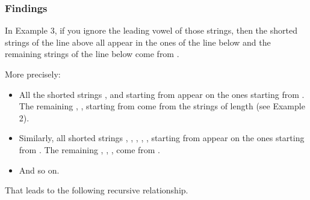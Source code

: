 \documentclass[letterpaper,12pt,english]{book}
\begin{document}
\subsubsection{Findings}
\label{\detokenize{Mathematics/09_MTH_1641_Count_Sorted_Vowel_Strings:findings}}
\sphinxAtStartPar
In Example 3, if you ignore the leading vowel of those strings, then the shorted strings of the line above all appear in the ones of the line below and the remaining strings of the line below come from .

\sphinxAtStartPar
More precisely:
\begin{itemize}
\item {} 
\sphinxAtStartPar
All the shorted strings ,  and  starting from  appear on the ones starting from . The remaining , ,  starting from  come from the strings of length  (see Example 2).

\item {} 
\sphinxAtStartPar
Similarly, all shorted strings , , , , ,  starting from  appear on the ones starting from . The remaining , , ,  come from .

\item {} 
\sphinxAtStartPar
And so on.

\end{itemize}

\sphinxAtStartPar
That leads to the following recursive relationship.
\end{document}
